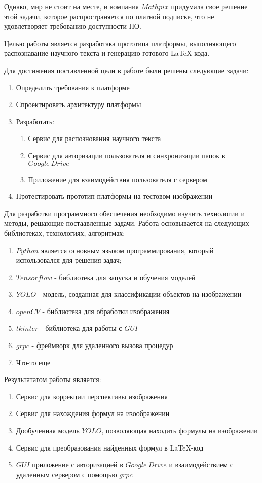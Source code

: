Однако, мир не стоит на месте, и компания $Mathpix$ придумала свое решение \cite{mathpix} этой задачи, которое распространяется по платной подписке, что не удовлетворяет требованию доступности ПО.

Целью работы является разработака прототипа платформы, выполняющего распознавание научного текста и  генерацию готового LaTeX кода.

Для достижения поставленной цели в работе были решены следующие задачи:
\begin{enumerate}[label=\arabic*)]
    \item Определить требования к платформе
    \item Спроектировать архитектуру платформы
    \item Разработать:
        \begin{enumerate}
            \item Сервис для распознования научного текста
            \item Сервис для авторизации пользователя и синхронизации папок в $Google\: Drive$
            \item Приложение для взаимодействия пользователя с сервером
        \end{enumerate}
    \item Протестировать прототип платформы на тестовом изображении
\end{enumerate}

Для разработки программного обеспечения необходимо изучить технологии и методы, решающие постаавленные задачи. Работа основывается на следующих библиотеках, технологиях, алгоритмах:
\begin{enumerate}
    \item $Python$ является основным языком программирования, который использовался для решения задач;
    \item $Tensorflow$ - библиотека для запуска и обучения моделей
    \item $YOLO$ - модель, созданная для классификации объектов на изображении
    \item $openCV$ - библиотека для обработки изображения
    \item $tkinter$ - библиотека для работы с $GUI$
    \item $grpc$ - фреймворк для удаленного вызова процедур
    \item Что-то еще
\end{enumerate}

Результататом работы является:
\begin{enumerate}
    \item Сервис для коррекции перспективы изображения
    \item Сервис для нахождения формул на изоображении
    \item Дообученная модель $YOLO$, позволяющая находить формулы на изображении
    \item Сервис для преобразования найденных формул в \LaTeX-код
    \item $GUI$ приложение с авторизацией в $Google\: Drive$ и взаимодействием с удаленным сервером с помощью $grpc$
\end{enumerate}